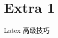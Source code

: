 \documentclass[11pt,a4paper]{moderncv}
\begin{document}
\renewcommand{\listitemsymbol}{-} %

\section{Extra 1}


%

\begin{thebibliography}{99}
 Latex 高级技巧
\end{thebibliography}
\end{document}
